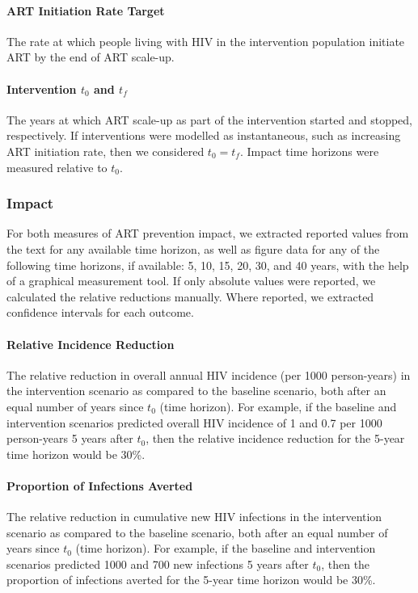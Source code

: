 \paragraph{ART Initiation Rate Target}
The rate at which people living with HIV in the intervention population initiate ART
by the end of ART scale-up.
\paragraph{Intervention $t_0$ and $t_f$}
The years at which ART scale-up as part of the intervention started and stopped, respectively.
If interventions were modelled as instantaneous, such as increasing ART initiation rate,
then we considered $t_0 = t_f$.
Impact time horizons were measured relative to $t_0$.
\subsubsection{Impact}
\label{aa:defs:impact}
For both measures of ART prevention impact,
we extracted reported values from the text for any available time horizon,
as well as figure data for any of the following time horizons, if available:
5, 10, 15, 20, 30, and 40 years, with the help of a graphical measurement tool.
If only absolute values were reported, we calculated the relative reductions manually.
Where reported, we extracted confidence intervals for each outcome.
\paragraph{Relative Incidence Reduction}
The relative reduction in overall annual HIV incidence (per 1000 person-years)
in the intervention scenario as compared to the baseline scenario,
both after an equal number of years since $t_0$ (time horizon).
For example, if the baseline and intervention scenarios predicted
overall HIV incidence of 1 and 0.7 per 1000 person-years 5 years after $t_0$,
then the relative incidence reduction for the 5-year time horizon would be 30\%.
\paragraph{Proportion of Infections Averted}
The relative reduction in cumulative new HIV infections
in the intervention scenario as compared to the baseline scenario,
both after an equal number of years since $t_0$ (time horizon).
For example, if the baseline and intervention scenarios predicted
1000 and 700 new infections 5 years after $t_0$,
then the proportion of infections averted for the 5-year time horizon would be 30\%.
